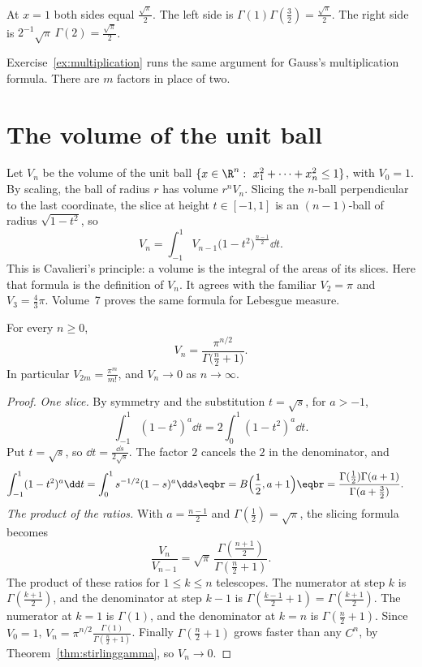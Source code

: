 At $x=1$ both sides equal $\frac{\sqrt\pi}2$. The left side is $\Gamma(1)\Gamma(\frac32)=\frac{\sqrt\pi}2$. The right side is $2^{-1}\sqrt\pi\,\Gamma(2)=\frac{\sqrt\pi}2$.

Exercise~\ref{ex:multiplication} runs the same argument for Gauss's multiplication formula. There are $m$ factors in place of two.

\section{The volume of the unit ball}

Let $V_n$ be the volume of the unit ball $\{x\in\R^n:\ x_1^2+\cdots+x_n^2\le1\}$, with $V_0=1$. By scaling, the ball of radius $r$
has volume $r^nV_n$. Slicing the $n$-ball perpendicular to the last coordinate, the slice at height $t\in[-1,1]$ is an
$(n-1)$-ball of radius $\sqrt{1-t^2}$, so
\[
V_n=\int_{-1}^1V_{n-1}\bigl(1-t^2\bigr)^{\frac{n-1}2}\dd t.
\]
This is Cavalieri's principle: a volume is the integral of the areas of its slices. Here that formula is the definition of $V_n$. It agrees with the familiar $V_2=\pi$ and $V_3=\frac43\pi$. Volume~7 proves the same formula for Lebesgue measure.

\begin{theorem}\label{thm:ballvolume}
For every $n\ge0$,
\[
V_n=\frac{\pi^{n/2}}{\Gamma\bigl(\frac n2+1\bigr)}.
\]
In particular $V_{2m}=\frac{\pi^m}{m!}$, and $V_n\to0$ as $n\to\infty$.
\end{theorem}
\begin{proof}
\emph{One slice.}
By symmetry and the substitution $t=\sqrt s$, for $a>-1$,
\[
\int_{-1}^1(1-t^2)^a\dd t=2\int_0^1(1-t^2)^a\dd t.
\]
Put $t=\sqrt s$, so $\dd t=\frac{\dd s}{2\sqrt s}$. The factor $2$ cancels the $2$ in the denominator, and
\[
\begin{aligned}\int_{-1}^1(1-t^2)^a\dd t&=\int_0^1s^{-1/2}(1-s)^a\dd s\eqbr=B\Bigl(\frac12,a+1\Bigr)\eqbr=\frac{\Gamma(\frac12)\Gamma(a+1)}{\Gamma(a+\frac32)}.\end{aligned}
\]
\emph{The product of the ratios.}
With $a=\frac{n-1}2$ and $\Gamma(\frac12)=\sqrt\pi$, the slicing formula becomes
\[
\frac{V_n}{V_{n-1}}=\sqrt\pi\,\frac{\Gamma(\frac{n+1}2)}{\Gamma(\frac n2+1)}.
\]
The product of these ratios for $1\le k\le n$ telescopes. The numerator at step $k$ is $\Gamma(\frac{k+1}2)$, and the denominator at step $k-1$ is $\Gamma(\frac{k-1}2+1)=\Gamma(\frac{k+1}2)$. The numerator at $k=1$ is $\Gamma(1)$, and the denominator at $k=n$ is $\Gamma(\frac n2+1)$. Since $V_0=1$,
$V_n=\pi^{n/2}\frac{\Gamma(1)}{\Gamma(\frac n2+1)}$. Finally $\Gamma(\frac n2+1)$ grows faster than any $C^n$, by Theorem~\ref{thm:stirlinggamma}, so
$V_n\to0$.
\end{proof}

